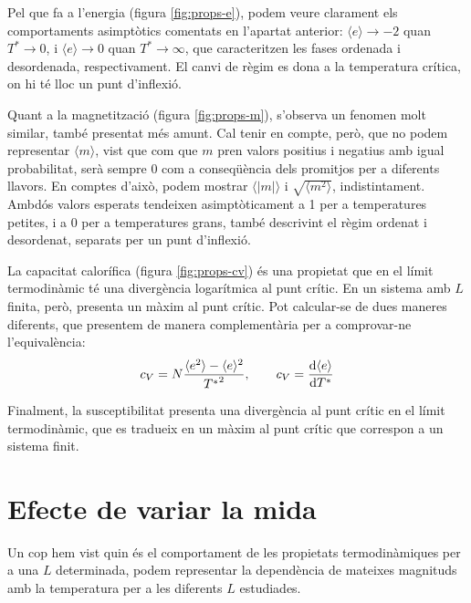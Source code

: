 \documentclass[a4paper]{article}
\begin{document}
Pel que fa a l'energia (figura \ref{fig:props-e}), podem veure clarament els comportaments asimptòtics comentats en l'apartat anterior: $\langle e \rangle \to -2$ quan $T^* \to 0$, i $\langle e \rangle \to 0$ quan $T^* \to \infty$, que caracteritzen les fases ordenada i desordenada, respectivament. El canvi de règim es dona a la temperatura crítica, on hi té lloc un punt d'inflexió.

Quant a la magnetització (figura \ref{fig:props-m}), s'observa un fenomen molt similar, també presentat més amunt. Cal tenir en compte, però, que no podem representar $\langle m \rangle$, vist que com que $m$ pren valors positius i negatius amb igual probabilitat, serà sempre 0 com a conseqüència dels promitjos per a diferents llavors. En comptes d'això, podem mostrar $\langle |m| \rangle$ i $\sqrt{\langle m^2 \rangle}$, indistintament. Ambdós valors esperats tendeixen asimptòticament a 1 per a temperatures petites, i a 0 per a temperatures grans, també descrivint el règim ordenat i desordenat, separats per un punt d'inflexió.

La capacitat calorífica (figura \ref{fig:props-cv}) és una propietat que en el límit termodinàmic té una divergència logarítmica al punt crític. En un sistema amb $L$ finita, però, presenta un màxim al punt crític. Pot calcular-se de dues maneres diferents, que presentem de manera complementària per a comprovar-ne l'equivalència:
\begin{equation*}
    c_V = N \frac{\langle e^2 \rangle - \langle e \rangle^2}{{T^*}^2}, \qquad c_V = \dv{\langle e \rangle}{T^*}
\end{equation*}

Finalment, la susceptibilitat presenta una divergència al punt crític en el límit termodinàmic, que es tradueix en un màxim al punt crític que correspon a un sistema finit.

\section{Efecte de variar la mida}

Un cop hem vist quin és el comportament de les propietats termodinàmiques per a una $L$ determinada, podem representar la dependència de mateixes magnituds amb la temperatura per a les diferents $L$ estudiades.
\end{document}
